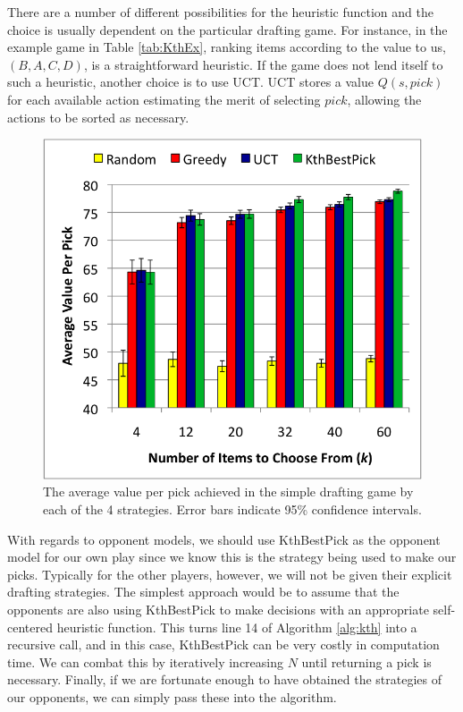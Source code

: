 \documentclass[letterpaper]{article}
\numberwithin{equation}{section}
\numberwithin{theorem}{section}
\numberwithin{lemma}{section}
\numberwithin{df}{section}
\begin{document}
There are a number of different possibilities for the heuristic function and the choice is usually dependent on the particular drafting game.  For instance, in the example game in Table \ref{tab:KthEx}, ranking items according to the value to us, $(B,A,C,D)$, is a straightforward heuristic.  If the game does not lend itself to such a heuristic, another choice is to use UCT.  UCT stores a value $Q(s,pick)$ for each available action estimating the merit of selecting $pick$, allowing the actions to be sorted as necessary.

\begin{figure}[t]
	\centering
	\includegraphics[scale=0.55]{figs/TableDraftColor2.png}
	\caption{The average value per pick achieved in the simple drafting game by each of the 4 strategies.  Error bars indicate 95\% confidence intervals.}
	\label{fig:SimpleDraftGraph}
\end{figure}

With regards to opponent models, we should use KthBestPick as the opponent model for our own play since we know this is the strategy being used to make our picks.  Typically for the other players, however, we will not be given their explicit drafting strategies.  The simplest approach would be to assume that the opponents are also using KthBestPick to make decisions with an appropriate self-centered heuristic function.  This turns line 14 of Algorithm \ref{alg:kth} into a recursive call, and in this case, KthBestPick can be very costly in computation time.  We can combat this by iteratively increasing $N$ until returning a pick is necessary.  Finally, if we are fortunate enough to have obtained the strategies of our opponents, we can simply pass these into the algorithm.
\end{document}
